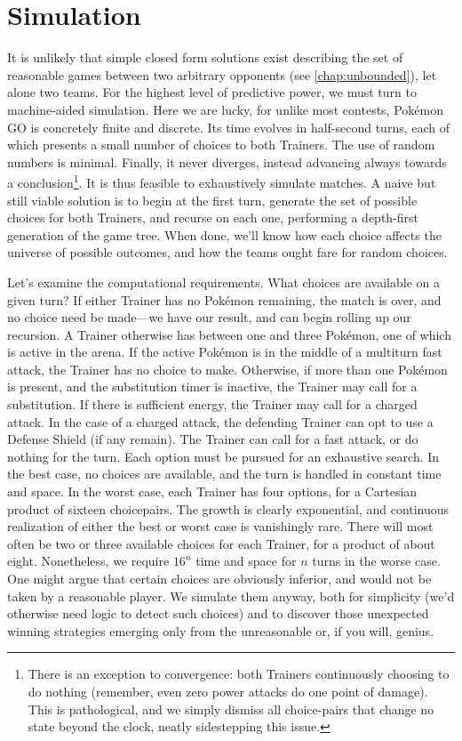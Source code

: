\chapter{Simulation}
\label{chap:simul}

It is unlikely that simple closed form solutions exist describing
 the set of reasonable games between two arbitrary opponents (see \autoref{chap:unbounded}),
 let alone two teams.
For the highest level of predictive power, we must turn to machine-aided simulation.
Here we are lucky, for unlike most contests, Pokémon GO is concretely finite and discrete.
Its time evolves in half-second turns, each of which presents a small number of choices
  to both Trainers.
The use of random numbers is minimal.
Finally, it never diverges, instead advancing always towards a conclusion\footnote{There
  is an exception to convergence: both Trainers continuously choosing to do nothing (remember,
  even zero power attacks do one point of damage). This is pathological, and we
  simply dismiss all choice-pairs that change no state beyond the clock, neatly sidestepping this issue.}.
It is thus feasible to exhaustively simulate matches.
A naive but still viable solution is to begin at the first turn, generate the set
  of possible choices for both Trainers, and recurse on each one, performing
  a depth-first generation of the game tree.
When done, we'll know how each choice affects the universe of possible outcomes,
  and how the teams ought fare for random choices.

Let's examine the computational requirements.
What choices are available on a given turn?
If either Trainer has no Pokémon remaining, the match is over, and no choice
  need be made---we have our result, and can begin rolling up our recursion.
A Trainer otherwise has between one and three Pokémon, one of which is active
  in the arena.
If the active Pokémon is in the middle of a multiturn fast attack, the
  Trainer has no choice to make.
Otherwise, if more than one Pokémon is present, and the substitution timer is
  inactive, the Trainer may call for a substitution.
If there is sufficient energy, the Trainer may call for a charged attack.
In the case of a charged attack, the defending Trainer can opt to use a Defense
  Shield (if any remain).
The Trainer can call for a fast attack, or do nothing for the turn.
Each option must be pursued for an exhaustive search.
In the best case, no choices are available, and the turn is handled in constant
  time and space.
In the worst case, each Trainer has four options, for a Cartesian product
  of sixteen choicepairs.
The growth is clearly exponential, and continuous realization of either the
  best or worst case is vanishingly rare.
There will most often be two or three available choices for each Trainer,
  for a product of about eight.
Nonetheless, we require $16^n$ time and space for $n$ turns in the worse case.
One might argue that certain choices are obviously inferior, and would not be taken
  by a reasonable player.
We simulate them anyway, both for simplicity (we'd otherwise need logic to
  detect such choices) and to discover those unexpected winning strategies
  emerging only from the unreasonable or, if you will, genius.


